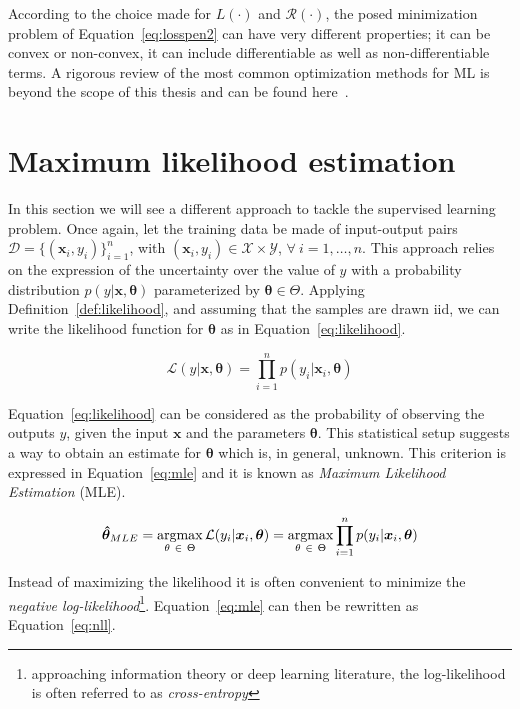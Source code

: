  According to the choice made for $L(\cdot)$ and $\mathcal{R}(\cdot)$, the posed minimization problem of Equation~\eqref{eq:losspen2} can have very different properties; it can be convex or non-convex, it can include differentiable as well as non-differentiable terms. A rigorous review of the most common optimization methods for ML is beyond the scope of this thesis and can be found here~\cite{boyd2004convex, bach2012optimization, sra2012optimization, nesterov2013introductory}.


\section{Maximum likelihood  estimation} \label{sec:mle}
In this section we will see a different approach to tackle the supervised learning problem.
Once again, let the training data be made of input-output pairs $\mathcal{D} = \{(\bm{x}_i, y_i)\}_{i=1}^n$, with $(\bm{x}_i,y_i) \in \mathcal{X} \times \mathcal{Y}$, $\forall~i=1,\dots,n$. This approach relies on the expression of the uncertainty over the value of $y$ with a probability distribution $p(y|\bm{x},\bm{\theta})$ parameterized by $\bm{\theta} \in \Theta$.
Applying Definition~\ref{def:likelihood}, and assuming that the samples are drawn \ac{iid}, we can write the likelihood function for $\bm{\theta}$ as in Equation~\eqref{eq:likelihood}.

\begin{equation} \label{eq:likelihood}
	\mathcal{L}(y|\bm{x}, \bm{\theta}) = \prod_{i=1}^{n} p(y_i | \bm{x}_i , \bm{\theta})
\end{equation}

Equation~\eqref{eq:likelihood} can be considered as the probability of observing the outputs $y$, given the input $\bm{x}$ and the parameters $\bm{\theta}$.
This statistical setup suggests a way to obtain an estimate for $\bm{\theta}$ which is, in general, unknown. This criterion is expressed in Equation~\eqref{eq:mle} and it is known as \textit{Maximum Likelihood Estimation} (MLE).

\begin{equation} \label{eq:mle}
	\bm{\hat \theta}_{MLE} =\mathop{\mathrm{argmax}}\limits_{\theta~\in~\Theta}\mathcal{L}(y_i|\bm{x}_i, \bm{\theta}) = \mathop{\mathrm{argmax}}\limits_{\theta~\in~\Theta} \prod_{i=1}^{n} p(y_i | \bm{x}_i, \bm{\theta})
\end{equation}

Instead of maximizing the likelihood it is often convenient to minimize the \textit{negative log-likelihood}\footnote{approaching information theory or deep learning literature, the log-likelihood is often referred to as \textit{cross-entropy}}. Equation~\eqref{eq:mle} can then be rewritten as Equation~\eqref{eq:nll}.

